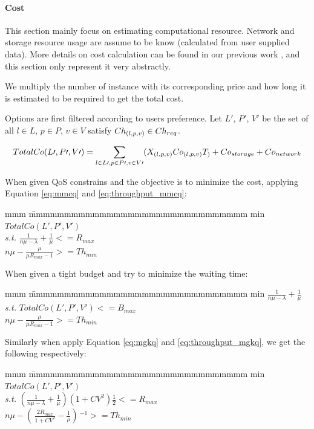 \paragraph{Cost}
This section mainly focus on estimating computational resource. Network and storage resource usage are assume to be know (calculated from user supplied data). More details on cost calculation can be found in our previous work \cite{IJNGC2013}, and this section only represent it very abstractly. 

We multiply the number of instance with its corresponding price and how long it is estimated to be required to get the total cost.

Options are first filtered according to users preference. Let $L\prime$, $P\prime$, $V\prime$ be the set of all $l \in L$, $p \in P$, $v \in V$ satisfy $Ch_{(l,p,v)} \in Ch_{req}$.

\begin{equation} \label{eq:cost}
TotalCo(L\prime,P\prime,V\prime) = \sum_{l \in L\prime, p \in P\prime, v \in V\prime} ( X_{(l,p,v)} Co_{(l,p,v)} T_) + Co_{storage} + Co_{network}
\end{equation}

When given QoS constrains and the objective is to minimize the cost, applying Equation \ref{eq:mmcq} and \ref{eq:throughput_mmcq}:

\begin{tabbing}
mmm  \=mmmmmmmmmmmmmmmmmmmmmmmmmmmmmmm \kill
min \> $TotalCo(L\prime,P\prime,V\prime)$ \\
{\it s.t.}  \> $\frac{ 1 }{n \mu - \lambda}+\frac{1}{\mu} <= R_{max}$ \\
            \> $n\mu - \frac{\mu}{\mu R_{max} - 1} >= Th_{min}$ 
\end{tabbing}

When given a tight budget and try to minimize the waiting time:

\begin{tabbing}
mmm  \=mmmmmmmmmmmmmmmmmmmmmmmmmmmmmmm \kill
min \> $\frac{ 1 }{n \mu - \lambda}+\frac{1}{\mu}$ \\
{\it s.t.}  \> $TotalCo(L\prime,P\prime,V\prime) <= B_{max}$ \\
            \> $n\mu - \frac{\mu}{\mu R_{max} - 1} >= Th_{min}$  
\end{tabbing}

Similarly when apply Equation \ref{eq:mgkq} and \ref{eq:throughput_mgkq}, we get the following respectively: 

\begin{tabbing}
mmm  \=mmmmmmmmmmmmmmmmmmmmmmmmmmmmmmm \kill
min \> $TotalCo(L\prime,P\prime,V\prime)$ \\
{\it s.t.}  \> $( \frac{ 1 }{n \mu - \lambda}+\frac{1}{\mu} ) ( 1+CV^2 ) \frac{1}{2} <= R_{max}$ \\
            \> $n \mu - ( \, \frac{ 2 R_{max} }{1+CV^2} - \frac{1}{\mu} ) \,^{-1} >= Th_{min}$ 
\end{tabbing}

